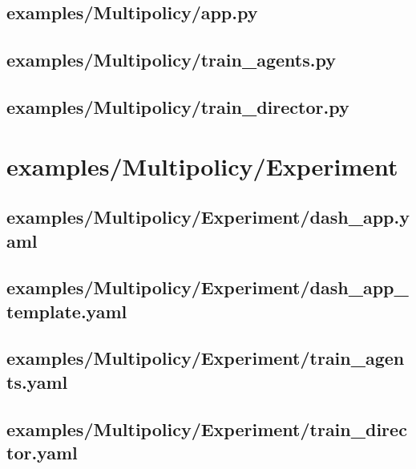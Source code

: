 \documentclass{article}
\begin{document}
\subsection[app.py]{examples/Multipolicy/app.py}

\newpage

\subsection[train\_agents.py]{examples/Multipolicy/train\_agents.py}

\newpage

\subsection[train\_director.py]{examples/Multipolicy/train\_director.py}

\newpage

\section{examples/Multipolicy/Experiment}
\subsection[dash\_app.yaml]{examples/Multipolicy/Experiment/dash\_app.yaml}

\newpage

\subsection[dash\_app\_template.yaml]{examples/Multipolicy/Experiment/dash\_app\_template.yaml}

\newpage

\subsection[train\_agents.yaml]{examples/Multipolicy/Experiment/train\_agents.yaml}

\newpage

\subsection[train\_director.yaml]{examples/Multipolicy/Experiment/train\_director.yaml}

\newpage
\end{document}
